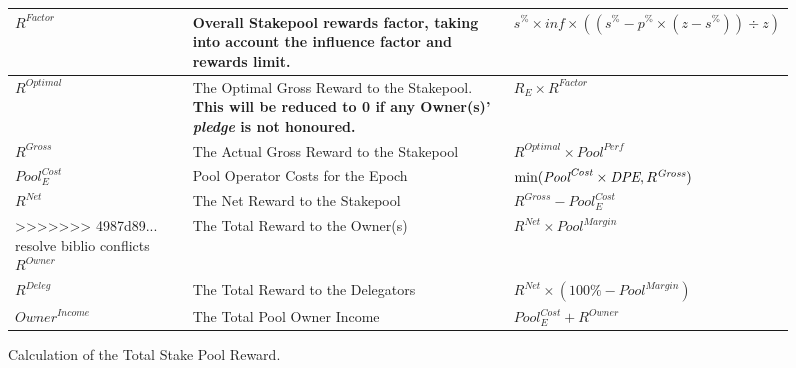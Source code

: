 \documentclass[11pt,a4paper,dvipsnames,twosided,final]{article}
\begin{document}
\begin{figure}[h!]
\begin{center}
\begin{tabular}{||l|p{6cm}|l||}
  $\textit{R}^\textit{Factor}$ & Overall Stakepool rewards factor, taking into account the influence factor and rewards limit. & $s^\% \times \textit{inf} \times ((s^\% - p^\% \times (z - s^\%)) \div z)$ \\\hline
  $R^{Optimal}$ & The Optimal Gross Reward to the Stakepool.  \textbf{This will be reduced to 0 if any Owner(s)' \emph{pledge} is not honoured.} & $R_E \times \textit{R}^{Factor}$ \\\hline
$R^{\textit{Gross}}$ & The Actual Gross Reward to the Stakepool & $R^{Optimal} \times \textit{Pool}^{\textit{Perf}}$ \\\hline
${\textit{Pool}}^{\textit{Cost}}_E$ & Pool Operator Costs for the Epoch & $\textrm{min}(\textit{\textit{Pool}}^{\textit{Cost}} \times \textit{DPE},R^{\textit{Gross}})$ \\\hline
$R^{\textit{Net}}$  & The Net Reward to the Stakepool & $R^{\textit{Gross}} - {\textit{Pool}}^{\textit{Cost}}_E$ \\\hline
>>>>>>> 4987d89... resolve biblio conflicts
$R^{\textit{Owner}}$ & The Total Reward to the Owner(s) & $R^{\textit{Net}} \times {\textit{Pool}}^{\textit{Margin}} $ \\\hline
$R^{\textit{Deleg}}$ & The Total Reward to the Delegators & $R^{\textit{Net}} \times (100\% - {\textit{Pool}}^{\textit{Margin}})$ \\\hline
$\textit{Owner}^\textit{Income}$ & The Total Pool Owner Income & ${\textit{Pool}}^{\textit{Cost}}_E + R^{Owner}$ \\\hline
\hline
\end{tabular}
\end{center}
\caption{Calculation of the Total Stake Pool Reward.}
\end{figure}
\end{document}
